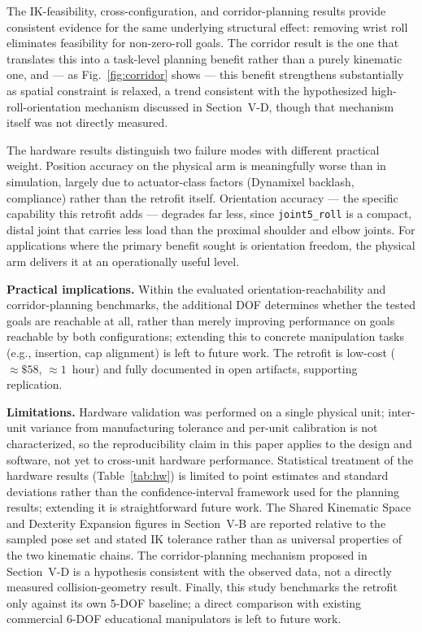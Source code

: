 \documentclass[conference]{IEEEtran}
\begin{document}
	The IK-feasibility, cross-configuration, and corridor-planning
	results provide consistent evidence for the same underlying
	structural effect: removing wrist roll eliminates feasibility for
	non-zero-roll goals. The corridor result is the one that translates
	this into a task-level planning benefit rather than a purely
	kinematic one, and — as Fig.~\ref{fig:corridor} shows — this benefit
	strengthens substantially as spatial constraint is relaxed, a trend
	consistent with the hypothesized high-roll-orientation mechanism
	discussed in Section~V-D, though that mechanism itself was not
	directly measured.
	
	The hardware results distinguish two failure modes with different
	practical weight. Position accuracy on the physical arm is
	meaningfully worse than in simulation, largely due to actuator-class
	factors (Dynamixel backlash, compliance) rather than the retrofit
	itself. Orientation accuracy — the specific capability this retrofit
	adds — degrades far less, since \texttt{joint5\_roll} is a compact,
	distal joint that carries less load than the proximal shoulder and
	elbow joints. For applications where the primary benefit sought is
	orientation freedom, the physical arm delivers it at an operationally
	useful level.
	
	\textbf{Practical implications.} Within the evaluated
	orientation-reachability and corridor-planning benchmarks, the
	additional DOF determines whether the tested goals are reachable at
	all, rather than merely improving performance on goals reachable by
	both configurations; extending this to concrete manipulation tasks
	(e.g., insertion, cap alignment) is left to future work. The retrofit
	is low-cost (${\approx}\$58$, ${\approx}1$~hour) and fully documented
	in open artifacts, supporting replication.
	
	\textbf{Limitations.} Hardware validation was performed on a single
	physical unit; inter-unit variance from manufacturing tolerance and
	per-unit calibration is not characterized, so the reproducibility
	claim in this paper applies to the design and software, not yet to
	cross-unit hardware performance. Statistical treatment of the
	hardware results (Table~\ref{tab:hw}) is limited to point estimates
	and standard deviations rather than the confidence-interval framework
	used for the planning results; extending it is straightforward future
	work. The Shared Kinematic Space and Dexterity Expansion figures in
	Section~V-B are reported relative to the sampled pose set and stated
	IK tolerance rather than as universal properties of the two
	kinematic chains. The corridor-planning mechanism proposed in
	Section~V-D is a hypothesis consistent with the observed data, not a
	directly measured collision-geometry result. Finally, this study
	benchmarks the retrofit only against its own 5-DOF baseline; a
	direct comparison with existing commercial 6-DOF educational
	manipulators is left to future work.
	
\end{document}
